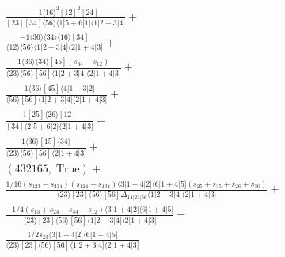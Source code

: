 \documentclass[varwidth, border=5pt]{standalone}
\begin{document}
\begin{my}
$\begin{gathered}
\scriptscriptstyle\frac{-1⟨16⟩^2[12]^2[24]}{[23][34]⟨56⟩⟨1|5+6|1]⟨1|2+3|4]}+\\
\scriptscriptstyle\frac{-1⟨36⟩⟨34⟩⟨16⟩[34]}{⟨12⟩⟨56⟩⟨1|2+3|4]⟨2|1+4|3]}+\\
\scriptscriptstyle\frac{1⟨36⟩⟨34⟩[45](s_{34}-s_{12})}{⟨23⟩⟨56⟩[56]⟨1|2+3|4]⟨2|1+4|3]}+\\
\scriptscriptstyle\frac{-1⟨36⟩[45]⟨4|1+3|2]}{⟨56⟩[56]⟨1|2+3|4]⟨2|1+4|3]}+\\
\scriptscriptstyle\frac{1[25]⟨26⟩[12]}{[34]⟨2|5+6|2]⟨2|1+4|3]}+\\
\scriptscriptstyle\frac{1⟨36⟩[15]⟨34⟩}{⟨23⟩⟨56⟩[56]⟨2|1+4|3]}+\\
\scriptscriptstyle(432165,\;\text{True})+\\
\scriptscriptstyle\frac{1/16(s_{123}-s_{234})(s_{124}-s_{134})⟨3|1+4|2]⟨6|1+4|5](s_{25}+s_{35}+s_{26}+s_{36})}{⟨23⟩[23]⟨56⟩[56]Δ_{14|23|56}⟨1|2+3|4]⟨2|1+4|3]}+\\
\scriptscriptstyle\frac{-1/4(s_{13}+s_{24}-s_{34}-s_{12})⟨3|1+4|2]⟨6|1+4|5]}{⟨23⟩[23]⟨56⟩[56]⟨1|2+3|4]⟨2|1+4|3]}+\\
\scriptscriptstyle\frac{1/2s_{23}⟨3|1+4|2]⟨6|1+4|5]}{⟨23⟩[23]⟨56⟩[56]⟨1|2+3|4]⟨2|1+4|3]}\phantom{+}
\end{gathered}$
\end{my}
\end{document}
